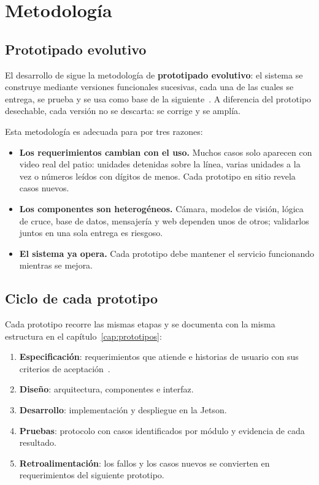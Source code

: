 \chapter{Metodología}
\label{cap:metodologia}

\section{Prototipado evolutivo}

El desarrollo de \saru{} sigue la metodología de \textbf{prototipado
evolutivo}: el sistema se construye mediante versiones funcionales
sucesivas, cada una de las cuales se entrega, se prueba y se usa como base
de la siguiente~\cite{sommerville2016}. A diferencia del prototipo
desechable, cada versión no se descarta: se corrige y se amplía.

Esta metodología es adecuada para \saru{} por tres razones:

\begin{itemize}
  \item \textbf{Los requerimientos cambian con el uso.} Muchos casos solo
        aparecen con video real del patio: unidades detenidas sobre la
        línea, varias unidades a la vez o números leídos con dígitos de
        menos. Cada prototipo en sitio revela casos nuevos.
  \item \textbf{Los componentes son heterogéneos.} Cámara, modelos de
        visión, lógica de cruce, base de datos, mensajería y web dependen
        unos de otros; validarlos juntos en una sola entrega es riesgoso.
  \item \textbf{El sistema ya opera.} Cada prototipo debe mantener el
        servicio funcionando mientras se mejora.
\end{itemize}

\section{Ciclo de cada prototipo}

Cada prototipo recorre las mismas etapas y se documenta con la misma
estructura en el capítulo~\ref{cap:prototipos}:

\begin{enumerate}
  \item \textbf{Especificación}: requerimientos que atiende e historias de
        usuario con sus criterios de aceptación~\cite{cohn2004}.
  \item \textbf{Diseño}: arquitectura, componentes e interfaz.
  \item \textbf{Desarrollo}: implementación y despliegue en la Jetson.
  \item \textbf{Pruebas}: protocolo con casos identificados por módulo y
        evidencia de cada resultado.
  \item \textbf{Retroalimentación}: los fallos y los casos nuevos se
        convierten en requerimientos del siguiente prototipo.
\end{enumerate}

